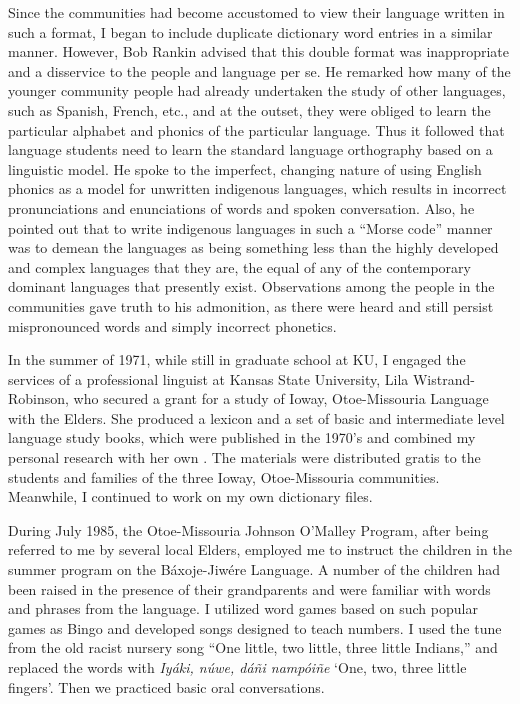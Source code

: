 \documentclass[output=paper]{LSP/langsci}
\begin{document}
Since the communities had become accustomed to view their language written in such a format, I began to include duplicate dictionary word entries in a similar manner. However, Bob Rankin advised that this double format was inappropriate and a disservice to the people and language per se. He remarked how many of the younger community people had already undertaken the study of other languages, such as Spanish, French, etc., and at the outset, they were obliged to learn the particular alphabet and phonics of the particular language. Thus it followed that language students need to learn the standard language orthography based on a linguistic model. He spoke to the imperfect, changing nature of using English phonics as a model for unwritten indigenous languages, which results in incorrect pronunciations and enunciations of words and spoken conversation. Also, he pointed out that to write indigenous languages in such a ``Morse code'' manner was to demean the languages as being something less than the highly developed and complex languages that they are, the equal of any of the contemporary dominant languages that presently exist. Observations among the people in the communities gave truth to his admonition, as there were heard and still persist mispronounced words and simply incorrect phonetics. 

In the summer of 1971, while still in graduate school at KU, I engaged the services of a professional linguist at Kansas State University, Lila Wistrand-Robinson, who secured a grant for a study of Ioway, Otoe-Missouria Language with the Elders. She produced a lexicon and a set of basic and intermediate level language study books, which were published in the 1970's and combined my personal research with her own \citep{OtoeIowaWistrandRobinson1977,OtoeIowaWistrandRobinson1978}. The materials were distributed gratis to the students and families of the three Ioway, Otoe-Missouria communities. Meanwhile, I continued to work on my own dictionary files.  

During July 1985, the Otoe-Missouria Johnson O'Malley Program, after being referred to me by several local Elders, employed me to instruct the children in the summer program on the Báxoje-Jiwére Language. A number of the children had been raised in the presence of their grandparents and were familiar with words and phrases from the language. I utilized word games based on such popular games as Bingo and developed songs designed to teach numbers. I used the tune from the old racist nursery song ``One little, two little, three little Indians,'' and replaced the words with \emph{Iyáki, núwe, dáñi nampóiñe} `One, two, three little fingers'. Then we practiced basic oral conversations.  
\end{document}

